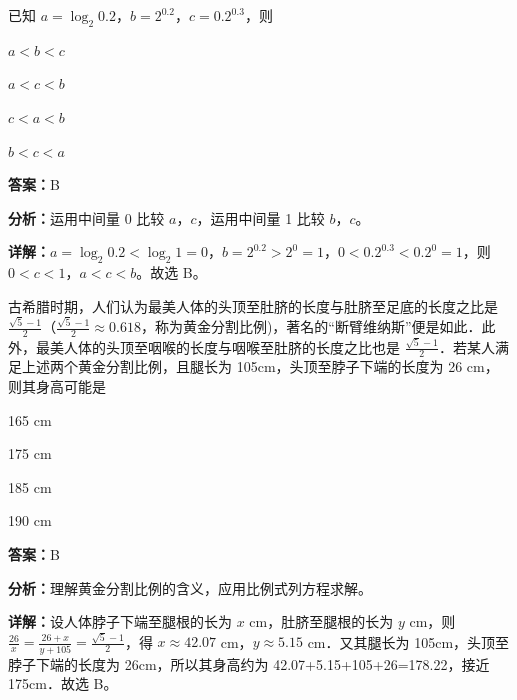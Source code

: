 \begin{question}[points=5]
已知 $a = \log_2 0.2$，$b = 2^{0.2}$，$c = 0.2^{0.3}$，则
\begin{choices}
  \item $a < b < c$
  \item $a < c < b$
  \item $c < a < b$
  \item $b < c < a$
\end{choices}
\begin{solution}
\textbf{答案：}B

\textbf{分析：}运用中间量 0 比较 $a$，$c$，运用中间量 1 比较 $b$，$c$。

\textbf{详解：}$a = \log_2 0.2 < \log_2 1 = 0$，$b = 2^{0.2} > 2^0 = 1$，$0 < 0.2^{0.3} < 0.2^0 = 1$，则 $0 < c < 1$，$a < c < b$。故选 B。
\end{solution}
\end{question}

\begin{question}[points=5]
古希腊时期，人们认为最美人体的头顶至肚脐的长度与肚脐至足底的长度之比是 $\frac{\sqrt{5}-1}{2}$（$\frac{\sqrt{5}-1}{2} \approx 0.618$，称为黄金分割比例)，著名的“断臂维纳斯”便是如此．此外，最美人体的头顶至咽喉的长度与咽喉至肚脐的长度之比也是 $\frac{\sqrt{5}-1}{2}$．若某人满足上述两个黄金分割比例，且腿长为 105cm，头顶至脖子下端的长度为 26 cm，则其身高可能是
\begin{choices}
  \item 165 cm
  \item 175 cm
  \item 185 cm
  \item 190 cm
\end{choices}
\begin{solution}
\textbf{答案：}B

\textbf{分析：}理解黄金分割比例的含义，应用比例式列方程求解。

\textbf{详解：}设人体脖子下端至腿根的长为 $x$ cm，肚脐至腿根的长为 $y$ cm，则 $\frac{26}{x} = \frac{26+x}{y+105} = \frac{\sqrt{5}-1}{2}$，得 $x \approx 42.07$ cm，$y \approx 5.15$ cm．又其腿长为 105cm，头顶至脖子下端的长度为 26cm，所以其身高约为 42.07+5.15+105+26=178.22，接近 175cm．故选 B。
\end{solution}
\end{question}

